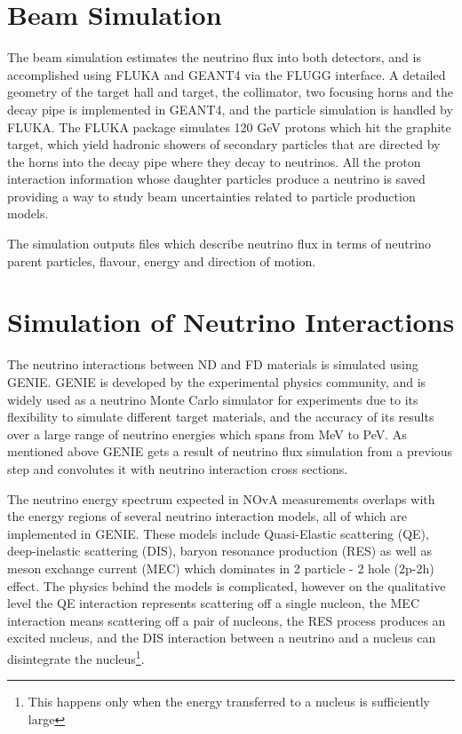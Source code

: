 \section{Beam Simulation}
The beam simulation estimates the neutrino flux into both detectors, and is accomplished using FLUKA and
GEANT4 via the FLUGG interface. A detailed geometry of the target hall and target, the collimator, two
focusing horns and the decay pipe is implemented in GEANT4, and the particle simulation is handled by
FLUKA. The FLUKA package simulates 120 GeV protons which hit the graphite target, which yield hadronic 
showers of secondary particles that are directed by the horns into the decay pipe where they decay to 
neutrinos. All the proton interaction information whose daughter particles produce a
neutrino is saved providing a way to study beam uncertainties related to particle production models. 

The simulation outputs files which describe neutrino flux in terms of neutrino parent particles, 
flavour, energy and direction of motion.

\section{Simulation of Neutrino Interactions}
The neutrino interactions between ND and FD materials is simulated using GENIE. GENIE is developed
by the experimental physics community, and is widely used as a neutrino Monte Carlo simulator for experiments due
to its flexibility to simulate different target materials, and the accuracy of its results over a large
range of neutrino energies which spans from MeV to PeV. As mentioned above GENIE gets a result of neutrino 
flux simulation from a previous step and convolutes it with neutrino interaction cross sections.

The neutrino energy spectrum expected in NOvA measurements overlaps
with the energy regions of several neutrino interaction models, all of which are implemented in GENIE.
These models include Quasi-Elastic scattering (QE), deep-inelastic scattering (DIS), baryon resonance
production (RES) as well as meson exchange current (MEC) which dominates in 2 particle - 2 hole (2p-2h) 
effect. The physics behind the models is complicated, however on the qualitative level the QE interaction 
represents scattering off a single nucleon, the MEC interaction means scattering off a pair of nucleons, 
the RES process produces an excited nucleus, and the DIS interaction between a neutrino and a nucleus can 
disintegrate the nucleus\footnote{This happens only when the energy transferred to a nucleus is 
sufficiently large}.

